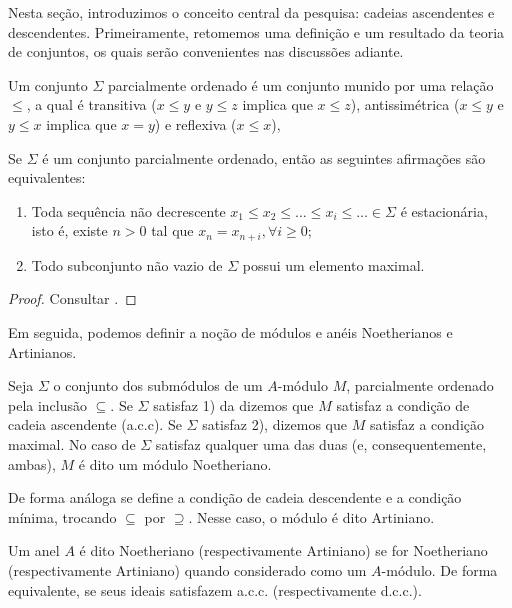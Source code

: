 \label{loc:condições_de_cadeia}
\recuo Nesta seção, introduzimos o conceito central da pesquisa: cadeias ascendentes e descendentes. Primeiramente, retomemos uma definição e um resultado da teoria de conjuntos, os quais serão convenientes nas discussões adiante.
\begin{definition}
	\label{loc:def_1_:_conjunto_parcialmente_ordenado}
	Um conjunto $\Sigma$ parcialmente ordenado é um conjunto munido por uma relação $\leq$, a qual é transitiva ($x \leq y$ e $y\leq z$ implica que $x\leq z$), antissimétrica ($x\leq y$ e $y\leq x$ implica que $x=y$) e reflexiva ($x \leq x$),
\end{definition}
\begin{proposition}
	\label{loc:6.1_:_equivalência_do_acc.enunciado}
	Se $\Sigma$ é um conjunto parcialmente ordenado, então as seguintes afirmações são equivalentes:
	\begin{enumerate}
		\item Toda sequência não decrescente $x_{1}\leq x_{2}\leq\dots\leq x_{i}\leq\dots \in \Sigma$  é estacionária, isto é, existe $n>0$ tal que $x_{n}=x_{n+i}, \forall i\geq0$;
		\item Todo subconjunto não vazio de $\Sigma$ possui um elemento maximal.
	\end{enumerate}
	\begin{proof}

		Consultar \textcite{geronimo}.
	\end{proof}
\end{proposition}
Em seguida, podemos definir a noção de módulos e anéis Noetherianos e Artinianos.
\begin{definition}
	\label{loc:def_2_:_noetheriano_e_artiniano.módulos}
	Seja $\Sigma$ o conjunto dos submódulos de um $A$-módulo $M$, parcialmente ordenado pela inclusão $\subseteq$.
	Se $\Sigma$ satisfaz 1) da  dizemos que $M$ satisfaz a condição de cadeia ascendente (a.c.c). Se $\Sigma$ satisfaz 2), dizemos que $M$ satisfaz a condição maximal.
	No caso de $\Sigma$ satisfaz qualquer uma das duas (e, consequentemente, ambas), $M$ é dito um módulo Noetheriano.

	De forma análoga se define a condição de cadeia descendente e a condição mínima, trocando $\subseteq$ por $\supseteq$. Nesse caso, o módulo é dito Artiniano.
\end{definition}
\begin{definition}
	\label{loc:def_2_:_noetheriano_e_artiniano.anéis}
	Um anel $A$ é dito Noetheriano (respectivamente Artiniano) se for Noetheriano (respectivamente Artiniano) quando considerado como um $A$-módulo.
	De forma equivalente, se seus ideais satisfazem a.c.c. (respectivamente d.c.c.).
\end{definition}

